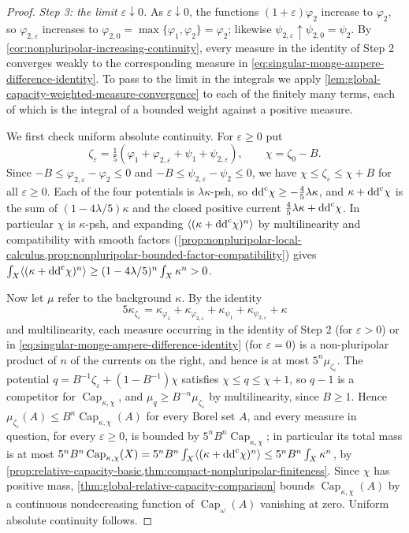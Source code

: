 \begin{proof}
\emph{Step 3: the limit $\varepsilon\downarrow0$.} As $\varepsilon\downarrow0$, the functions $(1+\varepsilon)\varphi_2$ increase to $\varphi_2$, so $\varphi_{2,\varepsilon}$ increases to $\varphi_{2,0}=\max\{\varphi_1,\varphi_2\}=\varphi_2$; likewise $\psi_{2,\varepsilon}\uparrow\psi_{2,0}=\psi_2$. By \cref{cor:nonpluripolar-increasing-continuity}, every measure in the identity of Step 2 converges weakly to the corresponding measure in \eqref{eq:singular-monge-ampere-difference-identity}. To pass to the limit in the integrals we apply \cref{lem:global-capacity-weighted-measure-convergence} to each of the finitely many terms, each of which is the integral of a bounded weight against a positive measure.

We first check uniform absolute continuity. For $\varepsilon\geq0$ put
\[
 \zeta_\varepsilon=\tfrac15
              (\varphi_1+\varphi_{2,\varepsilon}+\psi_1+\psi_{2,\varepsilon}),
 \qquad
 \chi=\zeta_0-B.
\]
Since $-B\leq\varphi_{2,\varepsilon}-\varphi_2\leq0$ and $-B\leq\psi_{2,\varepsilon}-\psi_2\leq0$, we have $\chi\leq\zeta_\varepsilon\leq\chi+B$ for all $\varepsilon\geq0$. Each of the four potentials is $\lambda\kappa$-psh, so $\mathrm{dd}^{\mathrm{c}}\chi\geq-\frac45\lambda\kappa$, and $\kappa+\mathrm{dd}^{\mathrm{c}}\chi$ is the sum of $(1-4\lambda/5)\kappa$ and the closed positive current $\frac45\lambda\kappa+\mathrm{dd}^{\mathrm{c}}\chi$. In particular $\chi$ is $\kappa$-psh, and expanding $\langle(\kappa+\mathrm{dd}^{\mathrm{c}}\chi)^n\rangle$ by multilinearity and compatibility with smooth factors (\cref{prop:nonpluripolar-local-calculus,prop:nonpluripolar-bounded-factor-compatibility}) gives $\int_X\langle(\kappa+\mathrm{dd}^{\mathrm{c}}\chi)^n\rangle\geq(1-4\lambda/5)^n\int_X\kappa^n>0$.

Now let $\mu$ refer to the background $\kappa$. By the identity
\[
 5\kappa_{\zeta_\varepsilon}
    =\kappa_{\varphi_1}+\kappa_{\varphi_{2,\varepsilon}}
                        +\kappa_{\psi_1}+\kappa_{\psi_{2,\varepsilon}}+\kappa
\]
and multilinearity, each measure occurring in the identity of Step 2 (for $\varepsilon>0$) or in \eqref{eq:singular-monge-ampere-difference-identity} (for $\varepsilon=0$) is a non-pluripolar product of $n$ of the currents on the right, and hence is at most $5^n\mu_{\zeta_\varepsilon}$. The potential $q=B^{-1}\zeta_\varepsilon+(1-B^{-1})\chi$ satisfies $\chi\leq q\leq\chi+1$, so $q-1$ is a competitor for $\operatorname{Cap}_{\kappa,\chi}$, and $\mu_q\geq B^{-n}\mu_{\zeta_\varepsilon}$ by multilinearity, since $B\geq1$. Hence $\mu_{\zeta_\varepsilon}(A)\leq B^n\operatorname{Cap}_{\kappa,\chi}(A)$ for every Borel set $A$, and every measure in question, for every $\varepsilon\geq0$, is bounded by $5^nB^n\operatorname{Cap}_{\kappa,\chi}$; in particular its total mass is at most $5^nB^n\operatorname{Cap}_{\kappa,\chi}(X)=5^nB^n\int_X\langle(\kappa+\mathrm{dd}^{\mathrm{c}}\chi)^n\rangle\leq5^nB^n\int_X\kappa^n$, by \cref{prop:relative-capacity-basic,thm:compact-nonpluripolar-finiteness}. Since $\chi$ has positive mass, \cref{thm:global-relative-capacity-comparison} bounds $\operatorname{Cap}_{\kappa,\chi}(A)$ by a continuous nondecreasing function of $\operatorname{Cap}_\omega(A)$ vanishing at zero. Uniform absolute continuity follows.


\end{proof}
